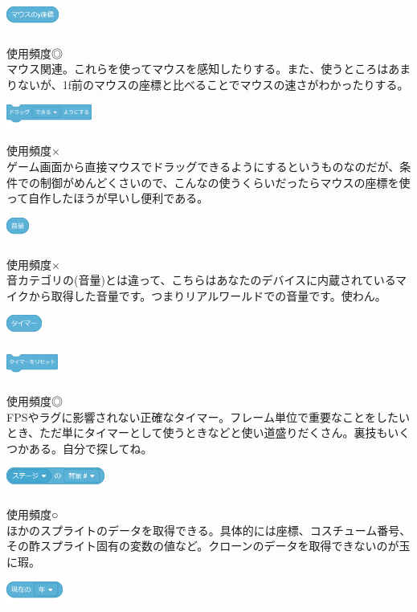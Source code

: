 \documentclass[b5paper,10pt]{jsarticle}
\begin{document}
\begin{multicols*}{3}
\begin{itembox}{7}
\includegraphics[height=8mm]{images/sensing_10.png}
\end{itembox}
使用頻度◎\\
マウス関連。これらを使ってマウスを感知したりする。また、使うところはあまりないが、1f前のマウスの座標と比べることでマウスの速さがわかったりする。
\begin{itembox}{8}
\includegraphics[height=8mm]{images/sensing_11.png}
\end{itembox}
使用頻度×\\
ゲーム画面から直接マウスでドラッグできるようにするというものなのだが、条件での制御がめんどくさいので、こんなの使うくらいだったらマウスの座標を使って自作したほうが早いし便利である。
\begin{itembox}{9}
\includegraphics[height=8mm]{images/sensing_12.png}
\end{itembox}
使用頻度×\\
音カテゴリの(音量)とは違って、こちらはあなたのデバイスに内蔵されているマイクから取得した音量です。つまりリアルワールドでの音量です。使わん。
\begin{itembox}{10}
\includegraphics[height=8mm]{images/sensing_13.png}

\includegraphics[height=8mm]{images/sensing_14.png}
\end{itembox}
使用頻度◎\\
FPSやラグに影響されない正確なタイマー。フレーム単位で重要なことをしたいとき、ただ単にタイマーとして使うときなどと使い道盛りだくさん。裏技もいくつかある。自分で探してね。
\begin{itembox}{11}
\includegraphics[height=8mm]{images/sensing_15.png}
\end{itembox}
使用頻度○\\
ほかのスプライトのデータを取得できる。具体的には座標、コスチューム番号、その酢スプライト固有の変数の値など。クローンのデータを取得できないのが玉に瑕。
\begin{itembox}{12}
\includegraphics[height=8mm]{images/sensing_16.png}


\end{itembox}
\end{multicols*}
\end{document}
